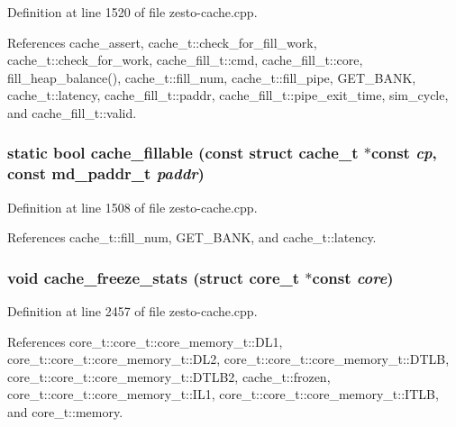 Definition at line 1520 of file zesto-cache.cpp.

References cache\_\-assert, cache\_\-t::check\_\-for\_\-fill\_\-work, cache\_\-t::check\_\-for\_\-work, cache\_\-fill\_\-t::cmd, cache\_\-fill\_\-t::core, fill\_\-heap\_\-balance(), cache\_\-t::fill\_\-num, cache\_\-t::fill\_\-pipe, GET\_\-BANK, cache\_\-t::latency, cache\_\-fill\_\-t::paddr, cache\_\-fill\_\-t::pipe\_\-exit\_\-time, sim\_\-cycle, and cache\_\-fill\_\-t::valid.
\subsubsection[{cache\_\-fillable}]{\setlength{\rightskip}{0pt plus 5cm}static bool cache\_\-fillable (const struct {\bf cache\_\-t} $\ast$const  {\em cp}, \/  const {\bf md\_\-paddr\_\-t} {\em paddr})\hspace{0.3cm}{\tt  [inline, static]}}\label{zesto-cache_8cpp_b1883760de25022c2b30d602d5b50c4a}




Definition at line 1508 of file zesto-cache.cpp.

References cache\_\-t::fill\_\-num, GET\_\-BANK, and cache\_\-t::latency.
\subsubsection[{cache\_\-freeze\_\-stats}]{\setlength{\rightskip}{0pt plus 5cm}void cache\_\-freeze\_\-stats (struct {\bf core\_\-t} $\ast$const  {\em core})}\label{zesto-cache_8cpp_bd1fe8334f2259dc773b85f98c7fbcfa}




Definition at line 2457 of file zesto-cache.cpp.

References core\_\-t::core\_\-t::core\_\-memory\_\-t::DL1, core\_\-t::core\_\-t::core\_\-memory\_\-t::DL2, core\_\-t::core\_\-t::core\_\-memory\_\-t::DTLB, core\_\-t::core\_\-t::core\_\-memory\_\-t::DTLB2, cache\_\-t::frozen, core\_\-t::core\_\-t::core\_\-memory\_\-t::IL1, core\_\-t::core\_\-t::core\_\-memory\_\-t::ITLB, and core\_\-t::memory.
